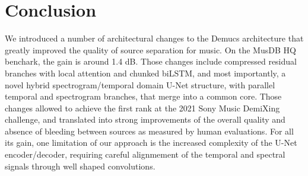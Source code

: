 \documentclass[10pt,a4paper,onecolumn]{article}
\begin{document}
\hypertarget{conclusion}{%
\section{Conclusion}\label{conclusion}}

We introduced a number of architectural changes to the Demucs
architecture that greatly improved the quality of source separation for
music. On the MusDB HQ benchark, the gain is around 1.4 dB. Those
changes include compressed residual branches with local attention and
chunked biLSTM, and most importantly, a novel hybrid
spectrogram/temporal domain U-Net structure, with parallel temporal and
spectrogram branches, that merge into a common core. Those changes
allowed to achieve the first rank at the 2021 Sony Music DemiXing
challenge, and translated into strong improvements of the overall
quality and absence of bleeding between sources as measured by human
evaluations. For all its gain, one limitation of our approach is the
increased complexity of the U-Net encoder/decoder, requiring careful
alignmement of the temporal and spectral signals through well shaped
convolutions.

\clearpage


\end{document}
